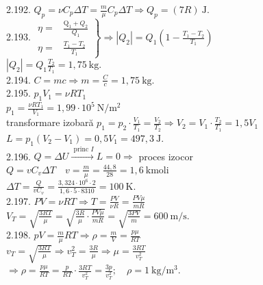 2.192. $Q_{p}=\nu C_{p} \Delta T=\frac{m}{\mu} C_{p} \Delta T \Rightarrow Q_{p}=(7 R) \mathrm{~J}$.\\

2.193. $\left.\begin{array}{rl}\eta= & \frac{\mathrm{Q}_{1}+Q_{2}}{Q_{1}} \\ \eta= & \frac{T_{1}-T_{2}}{T_{1}} \end{array}\right\} \Rightarrow\left|Q_{2}\right|=Q_{1}\left(1-\frac{T_{1}-T_{2}}{T_{1}}\right)$\\ $|Q_{2}|=Q_{1} \frac{T_{2}}{T_{1}}=1,75 \mathrm{~kg}$.\\

2.194. $C=m c \Rightarrow m=\frac{C}{c}=1,75 \mathrm{~kg}$.\\

2.195. $p_{1} V_{1}=\nu R T_{1}$\\ $p_{1}=\frac{\nu R T_{1}}{V_{1}}=1,99 \cdot 10^{5} \mathrm{~N} / \mathrm{m}^{2}$\\ transformare izobară $p_{1}=p_{2} \cdot \frac{V_{1}}{T_{1}}=\frac{V_{2}}{T_{2}} \Rightarrow V_{2}=V_{1} \cdot \frac{T_{2}}{T_{1}}=1,5 V_{1}$\\ $L=p_{1}\left(V_{2}-V_{1}\right)=0,5 V_{1}=497,3 \mathrm{~J}$.\\

2.196. $Q=\Delta U \xrightarrow{\text { princ } I} L=0 \Rightarrow$ proces izocor \\ $Q=v C_{v} \Delta T \quad v=\frac{m}{\mu}=\frac{44,8}{28}=1,6 \mathrm{~kmoli}$ \\ $\Delta T=\frac{Q}{v C_{v}}=\frac{3,324 \cdot 10^{6} \cdot 2}{1,6 \cdot 5 \cdot 8310}=100 \mathrm{~K}$.\\

2.197. $P V=\nu R T \Rightarrow T=\frac{P V}{\nu R}=\frac{P V \mu}{m R}$\\ $V_{T}=\sqrt{\frac{3 R T}{\mu}}=\sqrt{\frac{3 R}{\mu} \cdot \frac{P V \mu}{m R}}=\sqrt{\frac{3 P V}{m}}=600 \mathrm{~m} / \mathrm{s}$.\\

2.198. $p V=\frac{m}{\mu} R T \Rightarrow \rho=\frac{m}{V}=\frac{p \mu}{R T}$\\ $v_{T}=\sqrt{\frac{3 R T}{\mu}} \Rightarrow v_{T}^{2}=\frac{3 R}{\mu} \Rightarrow \mu=\frac{3 R T}{v_{T}^{2}}$ \\ $\Rightarrow \rho=\frac{p \mu}{R T}=\frac{p}{R T} \cdot \frac{3 R T}{v_{T}^{2}}=\frac{3 p}{v_{T}^{2}} ; \quad \rho=1 \mathrm{~kg} / \mathrm{m}^{3}$.\\

